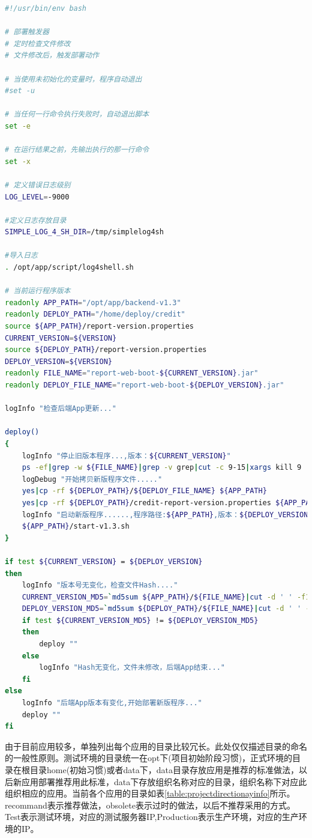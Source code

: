 \documentclass{book}
\begin{document}
\begin{lstlisting}[language=Bash]
#!/usr/bin/env bash

# 部署触发器
# 定时检查文件修改
# 文件修改后，触发部署动作

# 当使用未初始化的变量时，程序自动退出
#set -u

# 当任何一行命令执行失败时，自动退出脚本
set -e

# 在运行结果之前，先输出执行的那一行命令
set -x

# 定义错误日志级别
LOG_LEVEL=-9000

#定义日志存放目录
SIMPLE_LOG_4_SH_DIR=/tmp/simplelog4sh

#导入日志
. /opt/app/script/log4shell.sh

# 当前运行程序版本
readonly APP_PATH="/opt/app/backend-v1.3"
readonly DEPLOY_PATH="/home/deploy/credit"
source ${APP_PATH}/report-version.properties
CURRENT_VERSION=${VERSION}
source ${DEPLOY_PATH}/report-version.properties
DEPLOY_VERSION=${VERSION}
readonly FILE_NAME="report-web-boot-${CURRENT_VERSION}.jar"
readonly DEPLOY_FILE_NAME="report-web-boot-${DEPLOY_VERSION}.jar"

logInfo "检查后端App更新..."

deploy()
{
	logInfo "停止旧版本程序...,版本：${CURRENT_VERSION}"
	ps -ef|grep -w ${FILE_NAME}|grep -v grep|cut -c 9-15|xargs kill 9
	logDebug "开始拷贝新版程序文件....."
	yes|cp -rf ${DEPLOY_PATH}/${DEPLOY_FILE_NAME} ${APP_PATH}
	yes|cp -rf ${DEPLOY_PATH}/credit-report-version.properties ${APP_PATH}
	logInfo "启动新版程序......,程序路径:${APP_PATH},版本：${DEPLOY_VERSION}"
	${APP_PATH}/start-v1.3.sh
}

if test ${CURRENT_VERSION} = ${DEPLOY_VERSION}
then
	logInfo "版本号无变化，检查文件Hash...."
	CURRENT_VERSION_MD5=`md5sum ${APP_PATH}/${FILE_NAME}|cut -d ' ' -f1`
	DEPLOY_VERSION_MD5=`md5sum ${DEPLOY_PATH}/${FILE_NAME}|cut -d ' ' -f1`
	if test ${CURRENT_VERSION_MD5} != ${DEPLOY_VERSION_MD5}
	then
		deploy ""
	else
		logInfo "Hash无变化，文件未修改，后端App结束..."
	fi
else
	logInfo "后端App版本有变化,开始部署新版程序..."
	deploy ""
fi
\end{lstlisting}

由于目前应用较多，单独列出每个应用的目录比较冗长。此处仅仅描述目录的命名的一般性原则。测试环境的目录统一在opt下(项目初始阶段习惯)，正式环境的目录在根目录home(初始习惯)或者data下，data目录存放应用是推荐的标准做法，以后新应用部署推荐用此标准，data下存放组织名称对应的目录，组织名称下对应此组织相应的应用。当前各个应用的目录如表\ref{table:projectdirectionayinfo}所示。recommand表示推荐做法，obsolete表示过时的做法，以后不推荐采用的方式。Test表示测试环境，对应的测试服务器IP,Production表示生产环境，对应的生产环境的IP。
\end{document}
